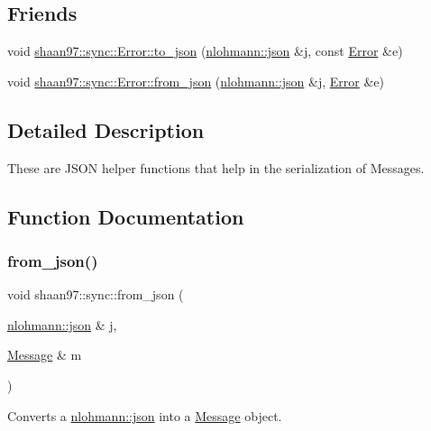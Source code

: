 \subsection*{Friends}
\begin{DoxyCompactItemize}
\item 
void \hyperlink{group___de_ga06e5a619d8d673a3bb00b006e62bbe1e}{shaan97\+::sync\+::\+Error\+::to\+\_\+json} (\hyperlink{namespacenlohmann_a2bfd99e845a2e5cd90aeaf1b1431f474}{nlohmann\+::json} \&j, const \hyperlink{classshaan97_1_1sync_1_1_error}{Error} \&e)
\item 
void \hyperlink{group___de_ga827d73b9e95e7aa59bf1b159251bedf3}{shaan97\+::sync\+::\+Error\+::from\+\_\+json} (\hyperlink{namespacenlohmann_a2bfd99e845a2e5cd90aeaf1b1431f474}{nlohmann\+::json} \&j, \hyperlink{classshaan97_1_1sync_1_1_error}{Error} \&e)
\end{DoxyCompactItemize}


\subsection{Detailed Description}
These are J\+S\+ON helper functions that help in the serialization of {\ttfamily Messages}. 

\subsection{Function Documentation}
\mbox{\label{group___de_gaba06015bb8b13049b093f0bde8e89377}} 
\subsubsection{\texorpdfstring{from\+\_\+json()}{from\_json()}\hspace{0.1cm}{\footnotesize\ttfamily [1/2]}}
{\footnotesize\ttfamily void shaan97\+::sync\+::from\+\_\+json (\begin{DoxyParamCaption}\item[{\hyperlink{namespacenlohmann_a2bfd99e845a2e5cd90aeaf1b1431f474}{nlohmann\+::json} \&}]{j,  }\item[{\hyperlink{structshaan97_1_1sync_1_1_message}{Message} \&}]{m }\end{DoxyParamCaption})}



Converts a {\ttfamily \hyperlink{namespacenlohmann_a2bfd99e845a2e5cd90aeaf1b1431f474}{nlohmann\+::json}} into a {\ttfamily \hyperlink{structshaan97_1_1sync_1_1_message}{Message}} object. 

